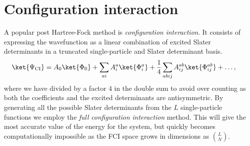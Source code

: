 \chapter{Configuration interaction}
     A popular post Hartree-Fock method is \textit{configuration interaction}.
     It consists of expressing the wavefunction as a linear combination of
     excited Slater determinants in a truncated single-particle and Slater
     determinant basis.
     \begin{align}
         \ket{\Psi_{\text{CI}}}
         &= A_0\ket{\Phi_0}
         + \sum_{ai}A^a_i\ket{\Phi^a_i}
         + \frac{1}{4}\sum_{abij}A^{ab}_{ij}\ket{\Phi^{ab}_{ij}}
         + \dots,
     \end{align}
     where we have divided by a factor $4$ in the double sum to avoid over
     counting as both the coefficients and the excited determinants are
     antisymmetric. By generating all the possible Slater determinants from the
     $L$ single-particle functions we employ the \textit{full configuration
     interaction} method. This will give the most accurate value of the energy
     for the system, but quickly becomes computationally impossible as the FCI
     space grows in dimensions as $\binom{L}{N}$.
     \cite{kvaal2017notes}

